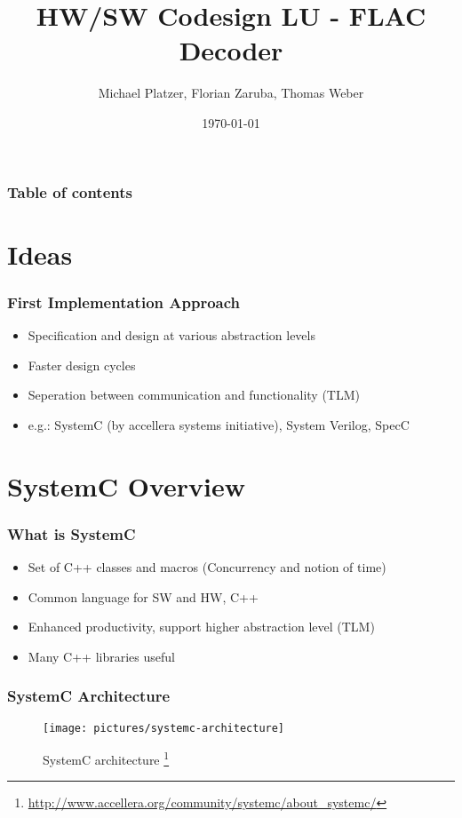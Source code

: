 \documentclass{beamer}
\begin{document}
\title[Entwurssprachen]{HW/SW Codesign LU - FLAC Decoder}
\author[Zaruba F., Weber T.]{Michael Platzer, Florian Zaruba, Thomas Weber}
\date{\today} 

\begin{frame}
\titlepage
\end{frame}

\begin{frame}\frametitle{Table of contents}
  \tableofcontents
\end{frame}


\section{Ideas} 
\begin{frame}\frametitle{First Implementation Approach} 
\begin{itemize}
	\item Specification and design at various abstraction levels
	\item Faster design cycles %
	\item Seperation between communication and functionality (TLM)
	\item e.g.: SystemC (by accellera systems initiative), System Verilog, SpecC
\end{itemize}
\end{frame}

\section{SystemC Overview}
\begin{frame}\frametitle{What is SystemC}
\begin{itemize}
	\item Set of C++ classes and macros (Concurrency and notion of time)
	\item Common language for SW and HW, C++
	\item Enhanced productivity, support higher abstraction level (TLM)
	\item Many C++ libraries useful
\end{itemize}
\end{frame}

\begin{frame}\frametitle{SystemC Architecture}
    \begin{figure}[hp]
	  \texttt{[image: pictures/systemc-architecture]}
      \caption{SystemC architecture \footnote{\url{http://www.accellera.org/community/systemc/about_systemc/}}}
      \label{fig:flow}
    \end{figure}
\end{frame}
\end{document}
